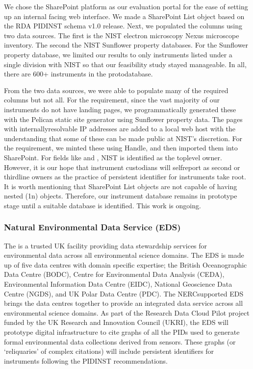 \documentclass[a4paper,10pt,english]{sphinxmanual}
\begin{document}
\sphinxAtStartPar
We chose the SharePoint platform as our evaluation portal for the ease
of setting up an internal facing web interface.  We made a SharePoint
List object based on the RDA PIDINST schema v1.0 release.  Next, we
populated the columns using two data sources.  The first is the NIST
electron microscopy Nexus microscope inventory.  The second the NIST
Sunflower property databases.  For the Sunflower property database, we
limited our results to only instruments listed under a single division
with NIST so that our feasibility study stayed manageable.  In all,
there are 600+ instruments in the proto\sphinxhyphen{}database.

\sphinxAtStartPar
From the two data sources, we were able to populate many of the
required columns but not all.  For the  requirement,
since the vast majority of our instruments do not have landing pages,
we programmatically generated these with the Pelican static site
generator using Sunflower property data.  The pages with
internally\sphinxhyphen{}resolvable IP addresses are added to a local web host with
the understanding that some of these can be made public at NIST’s
discretion.  For the  requirement, we minted these using
Handle, and then imported them into SharePoint.  For fields like
 and , NIST is identified as the top\sphinxhyphen{}level owner.
However, it is our hope that instrument custodians will self\sphinxhyphen{}report as
second or third\sphinxhyphen{}line owners as the practice of persistent identifier
for instruments take root.  It is worth mentioning that SharePoint
List objects are not capable of having nested (1\sphinxhyphen{}n) objects.
Therefore, our instrument database remains in prototype stage until a
suitable database is identified.  This work is on\sphinxhyphen{}going.


\subsubsection{Natural Environmental Data Service (EDS)}
\label{\detokenize{white-paper/adoption:natural-environmental-data-service-eds}}
\sphinxAtStartPar
The  is a trusted UK facility
providing data stewardship services for environmental data across
all environmental science domains. The EDS is made up of five data
centres with domain specific expertise; the British Oceanographic
Data Centre (BODC), Centre for Environmental Data Analysis (CEDA),
Environmental Information Data Centre (EIDC), National Geoscience
Data Centre (NGDS), and UK Polar Data Centre (PDC). The NERC\sphinxhyphen{}supported
EDS brings the data centres together to provide an integrated data
service across all environmental science domains. As part of the
Research Data Cloud Pilot project funded by the UK Research and
Innovation Council (UKRI), the EDS will prototype digital
infrastructure to cite graphs of all the PIDs used to generate
formal environmental data collections derived from sensors.
These graphs (or ‘reliquaries’ of complex citations) will include
persistent identifiers for instruments following the PIDINST
recommendations.
\end{document}
